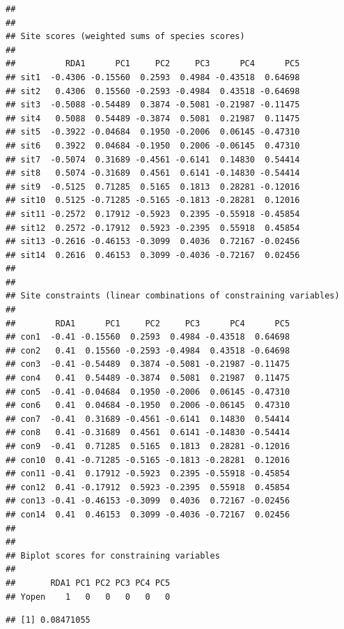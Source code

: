 \documentclass[
]{article}
\newenvironment{Shaded}{\begin{snugshade}}{\end{snugshade}}
\newcommand{\CommentTok}[1]{\textcolor[rgb]{0.56,0.35,0.01}{\textit{#1}}}
\newcommand{\FunctionTok}[1]{\textcolor[rgb]{0.13,0.29,0.53}{\textbf{#1}}}
\newcommand{\NormalTok}[1]{#1}
\newcommand{\SpecialCharTok}[1]{\textcolor[rgb]{0.81,0.36,0.00}{\textbf{#1}}}
\begin{document}
\begin{verbatim}
## 
## 
## Site scores (weighted sums of species scores)
## 
##          RDA1      PC1     PC2     PC3      PC4      PC5
## sit1  -0.4306 -0.15560  0.2593  0.4984 -0.43518  0.64698
## sit2   0.4306  0.15560 -0.2593 -0.4984  0.43518 -0.64698
## sit3  -0.5088 -0.54489  0.3874 -0.5081 -0.21987 -0.11475
## sit4   0.5088  0.54489 -0.3874  0.5081  0.21987  0.11475
## sit5  -0.3922 -0.04684  0.1950 -0.2006  0.06145 -0.47310
## sit6   0.3922  0.04684 -0.1950  0.2006 -0.06145  0.47310
## sit7  -0.5074  0.31689 -0.4561 -0.6141  0.14830  0.54414
## sit8   0.5074 -0.31689  0.4561  0.6141 -0.14830 -0.54414
## sit9  -0.5125  0.71285  0.5165  0.1813  0.28281 -0.12016
## sit10  0.5125 -0.71285 -0.5165 -0.1813 -0.28281  0.12016
## sit11 -0.2572  0.17912 -0.5923  0.2395 -0.55918 -0.45854
## sit12  0.2572 -0.17912  0.5923 -0.2395  0.55918  0.45854
## sit13 -0.2616 -0.46153 -0.3099  0.4036  0.72167 -0.02456
## sit14  0.2616  0.46153  0.3099 -0.4036 -0.72167  0.02456
## 
## 
## Site constraints (linear combinations of constraining variables)
## 
##        RDA1      PC1     PC2     PC3      PC4      PC5
## con1  -0.41 -0.15560  0.2593  0.4984 -0.43518  0.64698
## con2   0.41  0.15560 -0.2593 -0.4984  0.43518 -0.64698
## con3  -0.41 -0.54489  0.3874 -0.5081 -0.21987 -0.11475
## con4   0.41  0.54489 -0.3874  0.5081  0.21987  0.11475
## con5  -0.41 -0.04684  0.1950 -0.2006  0.06145 -0.47310
## con6   0.41  0.04684 -0.1950  0.2006 -0.06145  0.47310
## con7  -0.41  0.31689 -0.4561 -0.6141  0.14830  0.54414
## con8   0.41 -0.31689  0.4561  0.6141 -0.14830 -0.54414
## con9  -0.41  0.71285  0.5165  0.1813  0.28281 -0.12016
## con10  0.41 -0.71285 -0.5165 -0.1813 -0.28281  0.12016
## con11 -0.41  0.17912 -0.5923  0.2395 -0.55918 -0.45854
## con12  0.41 -0.17912  0.5923 -0.2395  0.55918  0.45854
## con13 -0.41 -0.46153 -0.3099  0.4036  0.72167 -0.02456
## con14  0.41  0.46153  0.3099 -0.4036 -0.72167  0.02456
## 
## 
## Biplot scores for constraining variables
## 
##       RDA1 PC1 PC2 PC3 PC4 PC5
## Yopen    1   0   0   0   0   0
\end{verbatim}

\begin{Shaded}
\end{Shaded}

\begin{verbatim}
## [1] 0.08471055
\end{verbatim}
\end{document}
